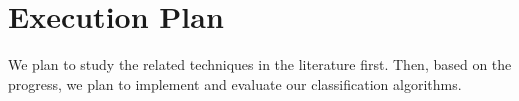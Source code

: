 \chapter{Execution Plan}

We plan to study the related techniques in the literature first. Then, based on
the progress, we plan to implement and evaluate our classification algorithms.

